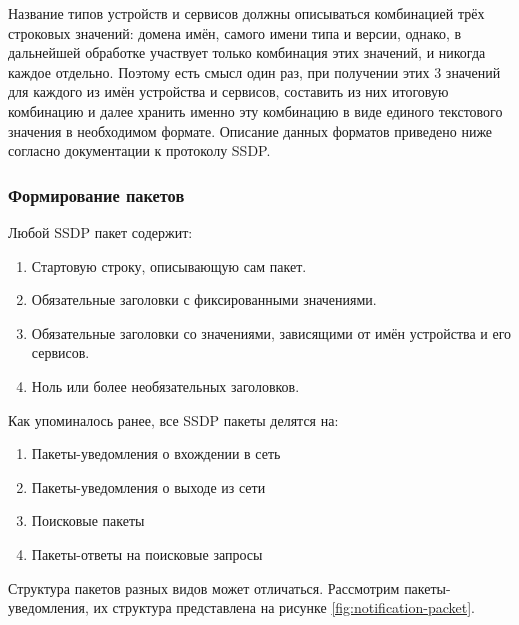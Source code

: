 Название типов устройств и сервисов должны описываться комбинацией трёх строковых значений: домена имён, самого имени типа и версии, однако, в дальнейшей обработке участвует только комбинация этих значений, и никогда каждое отдельно.
Поэтому есть смысл один раз, при получении этих 3 значений для каждого из имён устройства и сервисов, составить из них итоговую комбинацию и далее хранить именно эту комбинацию в виде единого текстового значения в необходимом формате.
Описание данных форматов приведено ниже согласно документации к протоколу SSDP.

\subsubsection{Формирование пакетов}

Любой SSDP пакет содержит:
\begin{enumerate}
	\item Стартовую строку, описывающую сам пакет.
	\item Обязательные заголовки с фиксированными значениями.
	\item Обязательные заголовки со значениями, зависящими от имён устройства и его сервисов.
	\item Ноль или более необязательных заголовков.
\end{enumerate}

Как упоминалось ранее, все SSDP пакеты делятся на:
\begin{enumerate}
	\item Пакеты-уведомления о вхождении в сеть
	\item Пакеты-уведомления о выходе из сети
	\item Поисковые пакеты
	\item Пакеты-ответы на поисковые запросы
\end{enumerate}

Структура пакетов разных видов может отличаться.
Рассмотрим пакеты-уведомления, их структура представлена на рисунке \ref{fig:notification-packet}.


